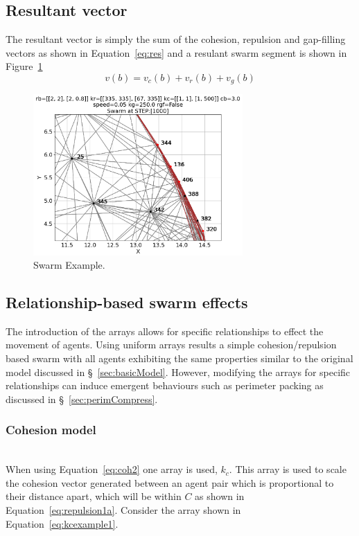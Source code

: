 \documentclass[12pt,a4paper]{IEEEtran}
\begin{document}
\subsection{Resultant vector}
The resultant vector is simply the sum of the cohesion, repulsion and
gap-filling vectors as shown in Equation~\ref{eq:res} and a resulant swarm segment is shown in Figure~\ref{fig:swarmExample}
\begin{equation}\label{eq:res}
	v(b) = v_c(b) + v_r(b) + v_g(b) 
\end{equation}

\begin{figure}[H]
	\begin{center}
		\includegraphics[width=8cm]{figures/perimeterCompress}
	\end{center}
	\caption{Swarm Example.\label{fig:swarmExample}}
\end{figure}

\subsection{Relationship-based swarm effects}

The introduction of the arrays allows for specific relationships to effect the movement of agents. Using uniform arrays results a simple cohesion/repulsion based swarm with all agents exhibiting the same properties similar to the original model discussed in \S~\ref{sec:basicModel}. However, modifying the arrays for specific relationships can induce emergent behaviours such as perimeter packing as discussed in \S~\ref{sec:perimCompress}.

\subsubsection{Cohesion model}~\\
When using Equation~\ref{eq:coh2} one array is used, $k_c$. This array is used to scale the cohesion vector generated between an agent pair which is proportional to their distance apart, which will be within $C$ as shown in Equation~\ref{eq:repulsion1a}. Consider the array shown in Equation~\ref{eq:kcexample1}.
\end{document}
